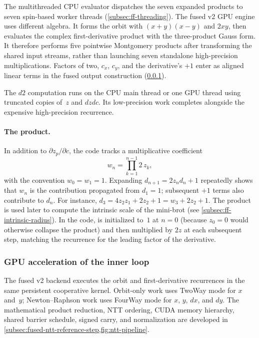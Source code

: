 The multithreaded CPU evaluator dispatches the seven expanded products to
seven spin-based worker threads (\cref{subsec:ff-threading}).  The fused v2 GPU
engine uses different algebra.  It forms the orbit with
$(x+y)(x-y)$ and $2xy$, then evaluates the complex first-derivative product
with the three-product Gauss form.  It therefore performs five pointwise
Montgomery products after transforming the shared input streams, rather than
launching seven standalone high-precision multiplications.  Factors of two,
$c_x$, $c_y$, and the derivative's $+1$ enter as aligned linear terms in the
fused output construction (\cref{subsec:ff-inner-gpu}).

The $d2$ computation runs on the CPU main thread or one GPU thread using
truncated copies of~$z$ and $\mathit{dzdc}$.  Its low-precision work completes
alongside the expensive high-precision recurrence.

\paragraph{The  product.}
In addition to $\partial z_p/\partial c$, the code tracks a multiplicative
coefficient
\begin{equation}\label{eq:ff-zcoeff}
w_n = \prod_{k=1}^{n-1} 2\,z_k,
\end{equation}
with the convention $w_0 = w_1 = 1$.  Expanding
$d_{n+1}=2z_nd_n+1$ repeatedly shows that $w_n$ is the contribution
propagated from $d_1=1$; subsequent $+1$ terms also contribute to $d_n$.
For instance, $d_3=4z_2z_1+2z_2+1=w_3+2z_2+1$.
The product is used later
to compute the intrinsic scale of the mini-brot (see
\cref{subsec:ff-intrinsic-radius}).  In the code,  is
initialized to~$1$ at $n=0$ (because $z_0 = 0$ would otherwise collapse the
product) and then multiplied by $2z$ at each subsequent step, matching the
recurrence for the leading factor of the derivative.

\subsubsection{GPU acceleration of the inner loop}
\label{subsec:ff-inner-gpu}

The fused v2 backend executes the orbit and first-derivative recurrences in the
same persistent cooperative kernel.  Orbit-only work uses TwoWay mode for
$x$ and~$y$; Newton--Raphson work uses FourWay mode for $x$, $y$, $dx$, and
$dy$.  The mathematical product reduction, NTT ordering, CUDA memory hierarchy,
shared barrier schedule, signed carry, and normalization are developed in
\cref{subsec:fused-ntt-reference-step,fig:ntt-pipeline}.

